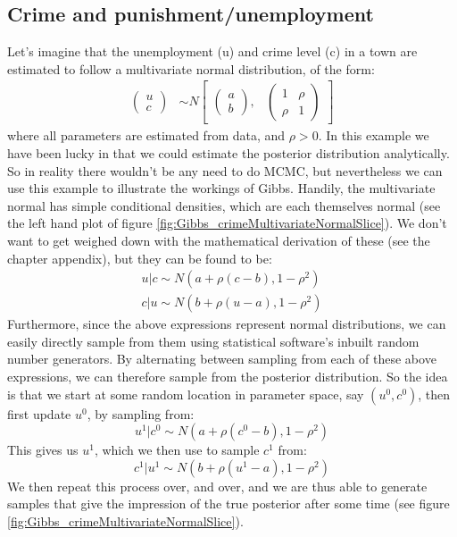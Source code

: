 \documentclass[11pt,fullpage]{book}
\begin{document}
\subsection{Crime and punishment/unemployment}\label{sec:Gibbs_crimeUnemployment}
Let's imagine that the unemployment (u) and crime level (c) in a town are estimated to follow a multivariate normal distribution, of the form:
%
\begin{align*}
\begin{pmatrix}u\\
c
\end{pmatrix} &\sim  N
\begin{bmatrix}
\begin{pmatrix}
a\\
b
\end{pmatrix}\!\!,&
\begin{pmatrix}
1 & \rho\\
\rho & 1
\end{pmatrix}
\end{bmatrix}
\end{align*}
%
where all parameters are estimated from data, and $\rho>0$. In this example we have been lucky in that we could estimate the posterior distribution analytically. So in reality there wouldn't be any need to do MCMC, but nevertheless we can use this example to illustrate the workings of Gibbs. Handily, the multivariate normal has simple conditional densities, which are each themselves normal (see the left hand plot of figure \ref{fig:Gibbs_crimeMultivariateNormalSlice}). We don't want to get weighed down with the mathematical derivation of these (see the chapter appendix), but they can be found to be:
%
\begin{align}
u|c \sim N(a+\rho(c-b),1-\rho^2)\\
c|u \sim N(b+\rho(u-a),1-\rho^2)
\end{align}
%
Furthermore, since the above expressions represent normal distributions, we can easily directly sample from them using statistical software's inbuilt random number generators. By alternating between sampling from each of these above expressions, we can therefore sample from the posterior distribution. So the idea is that we start at some random location in parameter space, say $(u^0,c^0)$, then first update $u^0$, by sampling from:
%
\begin{equation}
u^1|c^0 \sim N(a+\rho(c^0-b),1-\rho^2)
\end{equation}
%
This gives us $u^1$, which we then use to sample $c^1$ from:
%
\begin{equation}
c^1|u^1 \sim N(b+\rho(u^1-a),1-\rho^2)
\end{equation}
%
We then repeat this process over, and over, and we are thus able to generate samples that give the impression of the true posterior after some time (see figure \ref{fig:Gibbs_crimeMultivariateNormalSlice}).
\end{document}
